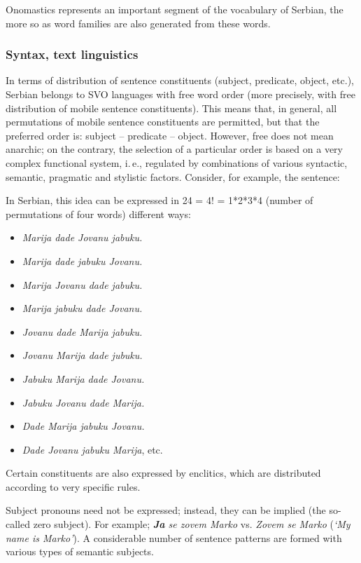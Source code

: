 \begin{multicols}{2}
Onomastics represents an important segment of the vocabulary of Serbian, the more so as word families are also generated from these words. 

\subsubsection {Syntax, text linguistics}

In terms of distribution of sentence constituents (subject, predicate, object, etc.), Serbian belongs to SVO languages with free word order (more precisely, with free distribution of mobile sentence constituents). This means that, in general, all permutations of mobile sentence constituents are permitted, but that the preferred order is: subject – predicate – object. However, free does not mean anarchic; on the contrary, the selection of a particular order is based on a very complex functional system, i.\,e., regulated by combinations of various syntactic, semantic, pragmatic and stylistic factors.  Consider, for example, the sentence:
In Serbian, this idea can be expressed in 24 = 4! = 1*2*3*4 (number of permutations of four words) different ways:
\begin{itemize}
 \item \textit{Marija dade Jovanu jabuku.}
 \item \textit{Marija dade jabuku Jovanu.}
\item \textit{Marija Jovanu dade jabuku.} 
\item \textit{Marija jabuku dade Jovanu.}
\item \textit{Jovanu dade Marija jabuku.}
\item \textit{Jovanu Marija dade jubuku.}
\item \textit{Jabuku Marija dade Jovanu.}
\item \textit{Jabuku Jovanu dade Marija.}
\item \textit{Dade Marija jabuku Jovanu. }
\item \textit{Dade Jovanu jabuku Marija}, etc.
\end{itemize}
Certain constituents are also expressed by enclitics, which are distributed according to very specific rules. 

Subject pronouns need not be expressed; instead, they can be implied (the so-called zero subject). For example; \textit{\textbf{Ja} se zovem Marko} vs. \textit{Zovem se Marko} (\textit{‘My name is Marko’}). A considerable number of sentence patterns are formed with various types of semantic subjects. 


\end{multicols}
